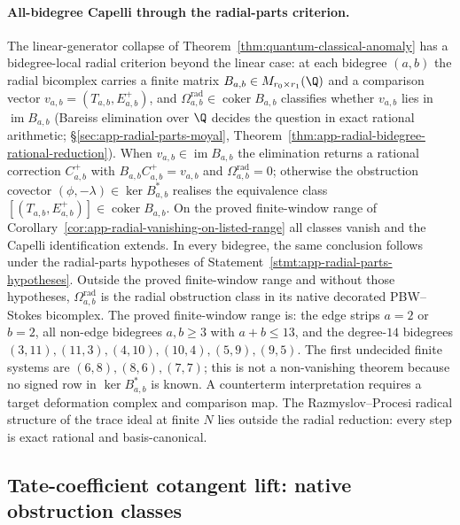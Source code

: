 \documentclass[11pt]{memoir}
\begin{document}
\paragraph{All-bidegree Capelli through the radial-parts criterion.}
The linear-generator collapse of
Theorem~\ref{thm:quantum-classical-anomaly} has a bidegree-local
radial criterion beyond the linear case: at
each bidegree \((a,b)\) the radial bicomplex carries a finite
matrix \(B_{a,b}\in M_{r_0\times r_1}(\Q)\) and a comparison vector
\(v_{a,b}=(T_{a,b},E^+_{a,b})\), and
\(\Omega^{\mathrm{rad}}_{a,b}\in\operatorname{coker}B_{a,b}\)
classifies whether \(v_{a,b}\) lies in
\(\operatorname{im}B_{a,b}\) (Bareiss elimination over \(\Q\)
decides the question in exact rational arithmetic;
\S\ref{sec:app-radial-parts-moyal},
Theorem~\ref{thm:app-radial-bidegree-rational-reduction}).  When
\(v_{a,b}\in\operatorname{im}B_{a,b}\) the elimination returns a
rational correction \(C^+_{a,b}\) with
\(B_{a,b}C^+_{a,b}=v_{a,b}\) and
\(\Omega^{\mathrm{rad}}_{a,b}=0\); otherwise the
obstruction covector \((\phi,-\lambda)\in\ker B^*_{a,b}\) realises
the equivalence class
\([(T_{a,b},E^+_{a,b})]\in\operatorname{coker}B_{a,b}\).  On the
proved finite-window range of
Corollary~\ref{cor:app-radial-vanishing-on-listed-range}
all classes vanish and the Capelli identification extends.  In every
bidegree, the same conclusion follows under the radial-parts hypotheses
of Statement~\ref{stmt:app-radial-parts-hypotheses}.  Outside the
proved finite-window range and without those hypotheses,
\(\Omega^{\mathrm{rad}}_{a,b}\) is the radial obstruction class in its
native decorated PBW--Stokes bicomplex.  The proved finite-window range
is: the edge
strips \(a=2\) or \(b=2\), all non-edge bidegrees \(a,b\ge3\) with
\(a+b\le13\), and the degree-\(14\) bidegrees
\((3,11),(11,3),(4,10),(10,4),(5,9),(9,5)\).  The first undecided
finite systems are \((6,8),(8,6),(7,7)\); this is not a non-vanishing
theorem because no signed row in \(\ker B^*_{a,b}\) is known.  A
counterterm interpretation requires a target deformation complex and
comparison map.  The
Razmyslov--Procesi radical structure of the trace ideal at finite
\(N\) lies outside the radial reduction: every step is exact
rational and basis-canonical.



\subsection{Tate-coefficient cotangent lift: native obstruction classes}\label{ssec:tate-residual-resolution}
\end{document}
